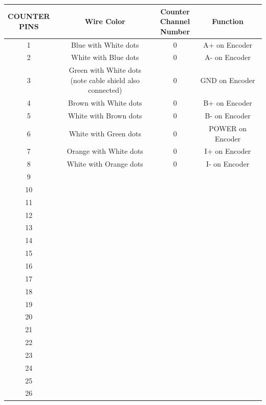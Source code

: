 \documentclass[12pt]{article}
\begin{document}
\begin{center}


\begin{tabular}{ |c|c|c|c| }


  \hline
  \thead{COUNTER \\ PINS} & \textbf{Wire Color} & \thead{Counter \\ Channel \\ Number} & \textbf{Function} \\ \hline
      
1	& Blue with White dots &	0 &	A+ on Encoder \\ \hline
2	& White with Blue dots &	0 &	A- on Encoder \\ \hline
3	& \makecell{Green with White dots \\ (note cable shield also connected)} &	0 &	GND on Encoder \\ \hline
4	& Brown with White dots &	0 &	B+ on Encoder \\ \hline
5	& White with Brown dots &	0 &	B- on Encoder \\ \hline
6	& White with Green dots & 	0 &	POWER on Encoder \\ \hline
7	& Orange with White dots &	0 &	I+ on Encoder \\ \hline
8	& White with Orange dots &	0 &	I- on Encoder \\ \hline
9 &	& & \\ \hline
10 &	& & \\ \hline
11 &	& & \\ \hline
12 &	& & \\ \hline
13 &	& & \\ \hline
14 &	& & \\ \hline
15 &	& & \\ \hline
16 &	& & \\ \hline
17 &	& & \\ \hline
18 &	& & \\ \hline
19 &	& & \\ \hline	
20 &	& & \\ \hline
21 &	& & \\ \hline
22 &	& & \\ \hline
23 &	& & \\ \hline
24 &	& & \\ \hline
25 &	& & \\ \hline
26 &	& & \\ \hline

  
\end{tabular}





\end{center}
\end{document}
